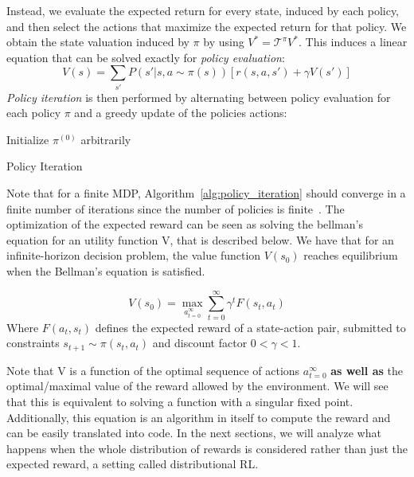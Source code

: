 \documentclass{article}
\begin{document}
Instead, we evaluate the expected return for every state, induced by each policy, and then select the actions that maximize the expected return for that policy. We obtain the state valuation induced by $\pi$ by using $V^{*}=\mathcal{T}^{\pi}V^{*}$. This induces a linear equation that can be solved exactly for \textit{policy evaluation}:
\[
V(s) = \sum_{s'}P(s'|s,a\sim\pi(s))[r(s,a,s')+\gamma V(s')]
\]
\textit{Policy iteration} is then performed by alternating between policy evaluation for each policy $\pi$ and a greedy update of the policies actions:
\begin{algorithm}[H]
Initialize $\pi^{(0)}$ arbitrarily$\;$

\SetAlgoLined
 \caption{Policy Iteration}
 \label{alg:policy_iteration}
\end{algorithm}

Note that for a finite MDP, Algorithm~\ref{alg:policy_iteration} should converge in a finite number of iterations since the number of policies is finite~\cite{sutton2011reinforcement}.
The optimization of the expected reward can be seen as solving the bellman's equation for an utility function V, that is described below. We have that for an infinite-horizon decision problem, the value function $V(s_0)$ reaches equilibrium when the Bellman's equation is satisfied.  
\begin{defn} 
\[
V(s_0) = \max_{{a}_{t=0}^{\infty}}{\sum_{t=0}^{\infty}\gamma^t F(s_t, a_t)}
\]
Where $F(a_t, s_t)$ defines the expected reward of a state-action pair, submitted to constraints $s_{t+1} \sim \pi(s_t,a_t)$ and discount factor $0<\gamma<1$.
\end{defn}

Note that V is a function of the optimal sequence of actions ${a}_{t=0}^{\infty}$ \textbf{as well as} the optimal/maximal value of the reward allowed by the environment. We will see that this is equivalent to solving a function with a singular fixed point. Additionally, this equation is an algorithm in itself to compute the reward and can be easily translated into code. 
\newline
\newline
In the next sections, we will analyze what happens when the whole distribution of rewards is considered rather than just the expected reward, a setting called distributional RL.
\end{document}
